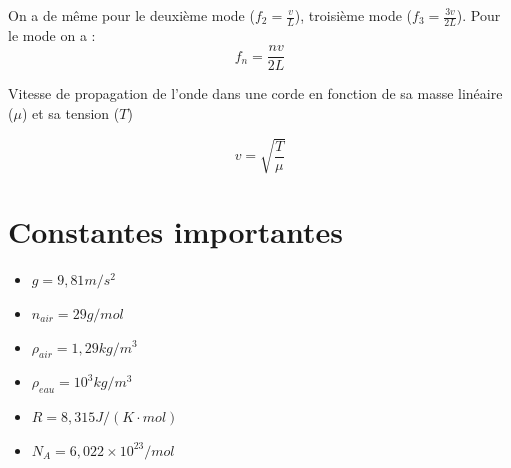 \documentclass{article}
\begin{document}
On a de même pour le deuxième mode ($f_2 = \frac{v}{L}$), troisième mode ($f_3 = \frac{3v}{2L}$).
Pour le mode on a :
\[f_n = \frac{nv}{2L}\]

Vitesse de propagation de l'onde dans une corde en fonction de sa masse linéaire ($\mu$) et sa tension ($T$)

\[v = \sqrt{\frac{T}{\mu}}\]

\section{Constantes importantes}

\begin{itemize}
    \item $g = 9,81 m/s^2$
    \item $n_{air} = 29g/mol$
    \item $\rho_{air} = 1,29 kg/m^3$
    \item $\rho_{eau} = 10^3 kg/m^3$
    \item $R = 8,315 J/(K\cdot mol)$
    \item $N_A = 6,022\times10^{23} /mol$
\end{itemize}
\end{document}
